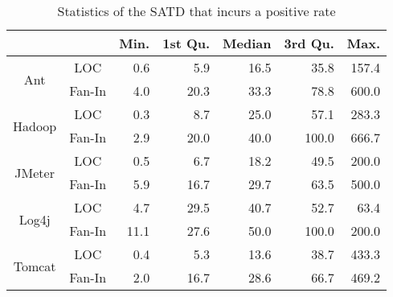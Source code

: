 \begin{table}[tb]
  \caption{Statistics of the SATD that incurs a positive rate}
  \label{tab:statistic}
  \centering

  \begin{tabular}{cc|rrrrr}
  \hline
      &  & \textbf{Min.} & \textbf{1st Qu.} & \textbf{Median} & \textbf{3rd Qu.} & \textbf{Max.} \\
  \hline
\multirow{2}{*}{Ant} &    LOC  & 0.6 &  5.9  &  16.5  &  35.8  &  157.4 \\
                     & Fan-In  & 4.0 & 20.3  &  33.3  &  78.8  &  600.0 \\
  \hline
\multirow{2}{*}{Hadoop} & LOC  & 0.3 &  8.7  &  25.0  &   57.1 &  283.3 \\
                     & Fan-In  & 2.9 & 20.0  &  40.0  &  100.0 &  666.7 \\
  \hline
\multirow{2}{*}{JMeter} & LOC  & 0.5 &  6.7  &  18.2  &   49.5 &  200.0 \\
                     & Fan-In  & 5.9 & 16.7  &  29.7  &   63.5 &  500.0 \\
  \hline
\multirow{2}{*}{Log4j} &  LOC  &  4.7 &  29.5 &  40.7  &   52.7 &   63.4 \\
                     & Fan-In  & 11.1 &  27.6 &  50.0  &  100.0 &  200.0 \\
  \hline
\multirow{2}{*}{Tomcat} & LOC  & 0.4 &  5.3  &  13.6  &   38.7 &  433.3 \\
                     & Fan-In  & 2.0 & 16.7  &  28.6  &   66.7 &  469.2 \\
  \hline
  \end{tabular}
\end{table}